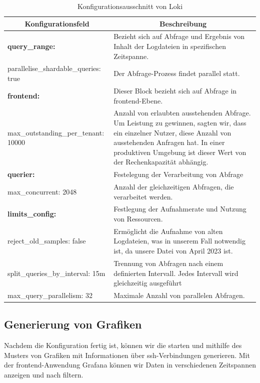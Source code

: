 \begin{table}[H]
  \begin{tabularx}{\textwidth}{|m{6cm}|X|}
  \hline
  \multicolumn{1}{|c|}{\textbf{Konfigurationsfeld}} & \multicolumn{1}{|c|}{\textbf{Beschreibung}} \\
  \hline
  \textbf{query\_range:} & Bezieht sich auf Abfrage und Ergebnis von Inhalt der Logdateien in spezifischen Zeitspanne. \\
  \hphantom{te}parallelise\_shardable\_queries: true & Der Abfrage-Prozess findet parallel statt.\\ \hline

  \textbf{frontend:} & Dieser Block bezieht sich auf Abfrage in \gls{frontend}-Ebene. \\
  \hphantom{te}max\_outstanding\_per\_tenant: 10000 & Anzahl von erlaubten ausstehenden Abfrage. Um Leistung zu gewinnen, sagten wir, dass ein einzelner Nutzer, diese Anzahl von ausstehenden Anfragen hat. In einer produktiven Umgebung ist dieser Wert von der Rechenkapazität abhängig.\\ \hline

  \textbf{querier:} & Festelegung der Verarbeitung von Abfrage \\ 
  \hphantom{te}max\_concurrent: 2048 & Anzahl der gleichzeitigen Abfragen, die verarbeitet werden. \\ \hline

  \textbf{limits\_config:} & Festlegung der Aufnahmerate und Nutzung von Ressourcen. \\ 
  \hphantom{te}reject\_old\_samples: false & Ermöglicht die Aufnahme von alten Logdateien, was in unserem Fall notwendig ist, da unsere Datei von April 2023 ist. \\ 
  \hphantom{te}split\_queries\_by\_interval: 15m & Trennung von Abfragen nach einem definierten Intervall. Jedes Intervall wird gleichzeitig ausgeführt \\ 
  \hphantom{te}max\_query\_parallelism: 32 & Maximale Anzahl von parallelen Abfragen.  \\ \hline

  \end{tabularx}
  \caption[Konfigurationsausschnitt von Loki]
  {Konfigurationsausschnitt von Loki}
  \label{tab:KonfigLoki}
\end{table}

\newpage
\subsection{Generierung von Grafiken}
Nachdem die Konfiguration fertig ist, können wir die  starten und mithilfe des Musters von \cite{VoidQuark_sshlogs} Grafiken mit Informationen über \gls{ssh}-Verbindungen generieren. Mit der \gls{frontend}-Anwendung Grafana können wir Daten in verschiedenen Zeitspannen anzeigen und nach  filtern. 
 
